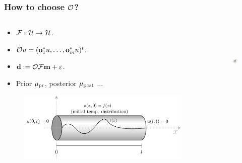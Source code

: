 \documentclass{beamer}
\begin{document}
\begin{frame}
  \frametitle{How to choose $\mathcal{O}$?}
  \begin{columns}
    \begin{column}{0.5\textwidth}
      
      \begin{itemize}
      \item \(\mathcal{F}: \mathcal{H} \to \mathcal{H}\).
      \item \(\mathcal{O} u = (\mathbf{o}_1^*u, \dots, \mathbf{o}_m^*u )^t\).
      \item \(\mathbf{d} := \mathcal{O} \mathcal{F} \mathbf{m} + \varepsilon\).
      \item Prior $\mu_{\textup{pr}}$, posterior $\mu_{\textup{post}}$ ...
      \end{itemize}
  
      \begin{figure}
        \centering
        \includegraphics[width=1.2\textwidth, height=0.66\textwidth]{figs/heat_rod.png}
      \end{figure}
    \end{column}

    \begin{column}{0.5\textwidth}

      \begin{figure}
        \centering
        \includegraphics[width=\linewidth, height=3.5cm]{figs/CT.png}
      \end{figure}


\end{column}
\end{columns}
\end{frame}
\end{document}
